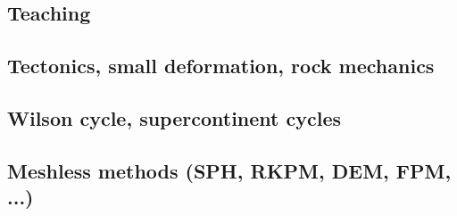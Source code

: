\subsection{Teaching} 

{\scriptsize
\cite{kerh14}
\cite{bemg19}
}
\subsection{Tectonics, small deformation, rock mechanics}

{\scriptsize
\noindent
\cite{ilma93}
\cite{hept96}
\cite{esfm08}
\cite{lega12}
}

\subsection{Wilson cycle, supercontinent cycles}

{\scriptsize
\noindent
\cite{trry95}
\cite{evan03}
\cite{zhzl07}\cite{copb07}
\cite{zhzm09}\cite{onlj09}
\cite{lemj11}
\cite{buto14}\cite{helo14}\cite{roct14}
\cite{begb19}\cite{wihb19}
}

\subsection{Meshless methods (SPH, RKPM, DEM, FPM, ...)}

{\scriptsize
\noindent
\cite{lucy77}
\cite{beko96}
\cite{mofz97}
\cite{begl00}
\cite{lilr02}
\cite{lill03}
\cite{wali04}
\cite{febh05}\cite{lixl05}
\cite{dacl10}
\cite{prcl11}\cite{kukg11}
\cite{koau13}\cite{viau13}
\cite{dazs14}
\cite{nifs15}
\cite{krrk18}
}

